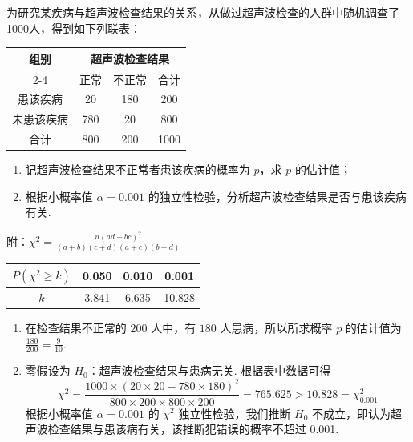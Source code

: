 \documentclass[UTF8,a4paper,oneside,11pt]{ctexbook}
\begin{document}
\begin{problem}
为研究某疾病与超声波检查结果的关系，从做过超声波检查的人群中随机调查了1000人，得到如下列联表：

\begin{center}
\begin{tabular}{|c|c|c|c|}
\hline
\multicolumn{1}{|c|}{组别} & \multicolumn{3}{c|}{超声波检查结果} \\
\cline{2-4}
 & 正常 & 不正常 & 合计 \\
\hline
患该疾病 & 20 & 180 & 200 \\
\hline
未患该疾病 & 780 & 20 & 800 \\
\hline
合计 & 800 & 200 & 1000 \\
\hline
\end{tabular}
\end{center}

\begin{enumerate}
\item 记超声波检查结果不正常者患该疾病的概率为 \(p\)，求 \(p\) 的估计值；
\item 根据小概率值 \(\alpha = 0.001\) 的独立性检验，分析超声波检查结果是否与患该疾病有关.
\end{enumerate}

附：\(\chi^2 = \frac{n(ad-bc)^2}{(a+b)(c+d)(a+c)(b+d)}\)

\begin{center}
\begin{tabular}{|c|c|c|c|}
\hline
\(P(\chi^2 \ge k)\) & 0.050 & 0.010 & 0.001 \\
\hline
\(k\) & 3.841 & 6.635 & 10.828 \\
\hline
\end{tabular}
\end{center}
\end{problem}

\begin{solution}
\begin{enumerate}
\item 在检查结果不正常的 \(200\) 人中，有 \(180\) 人患病，所以所求概率 \(p\) 的估计值为 \(\frac{180}{200}=\frac{9}{10}\).

\item 零假设为 \(H_0\)：超声波检查结果与患病无关.
根据表中数据可得
\[
\chi^2=\frac{1000\times(20\times20-780\times180)^2}{800\times200\times800\times200}=765.625>10.828=\chi^2_{0.001}
\]
根据小概率值 \(\alpha=0.001\) 的 \(\chi^2\) 独立性检验，我们推断 \(H_0\) 不成立，即认为超声波检查结果与患该病有关，该推断犯错误的概率不超过 0.001.
\end{enumerate}
\end{solution}
\end{document}
